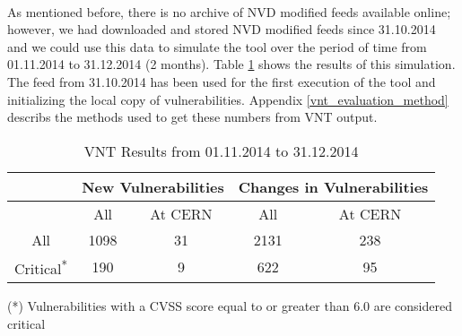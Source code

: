 \paragraph{}
As mentioned before, there is no archive of NVD modified feeds available online; however, we had downloaded and stored NVD modified feeds since 31.10.2014 and we could use this data to simulate the tool over the period of time from 01.11.2014 to 31.12.2014 (2 months). Table \ref{table:vnt_results} shows the results of this simulation. The feed from 31.10.2014 has been used for the first execution of the tool and initializing the local copy of vulnerabilities. Appendix \ref{vnt_evaluation_method} describs the methods used to get these numbers from VNT output.

\begin{table}
\begin{center}
    \begin{tabular}{ | c || c | c || c | c |}
    
    \hline
	 
     &  \multicolumn{2}{c||}{New Vulnerabilities} &  \multicolumn{2}{c|}{Changes in Vulnerabilities}  
	\\ \hline   
      &  All &  At CERN &  All &  At CERN
    \\ 
	\hline    
       All & \multicolumn{1}{|c|}{\cellcolor{red!25}1098}   &  31 & \multicolumn{1}{|c|}{\cellcolor{red!25}2131}  & 238 
   \\ \hhline{|*5-}
\hhline{~~|-|~|-|}
Critical\textsuperscript{*} & 190  & \multicolumn{1}{|c||}{\cellcolor{green!25}9}  & 622  & \multicolumn{1}{|c|}{\cellcolor{green!25}95  }
    \\ \hline
    \end{tabular}
    \caption{VNT Results from 01.11.2014 to 31.12.2014}
    \label{table:vnt_results}
   \end{center}
   \footnotesize{(*) Vulnerabilities with a CVSS score equal to or greater than 6.0 are considered critical}
    \end{table}


